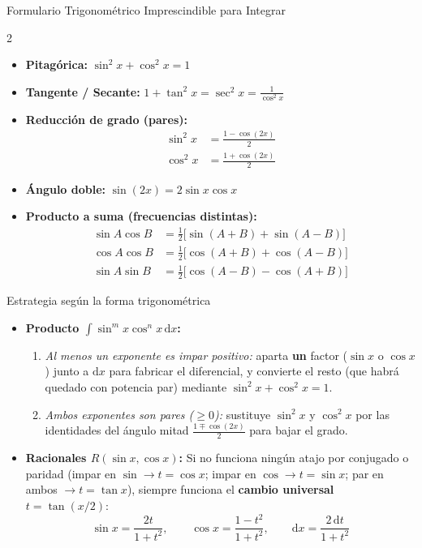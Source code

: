 \documentclass[10pt,a4paper]{article}
\begin{document}
\begin{formulabox}{Formulario Trigonométrico Imprescindible para Integrar}
\begin{multicols}{2}
\begin{itemize}\itemsep 2pt
  \item \textbf{Pitagórica:} $\sin^2 x + \cos^2 x = 1$
  \item \textbf{Tangente / Secante:} $1 + \tan^2 x = \sec^2 x = \frac{1}{\cos^2 x}$
  \item \textbf{Reducción de grado (pares):}
  \begin{align*}
    \sin^2 x &= \frac{1 - \cos(2x)}{2} \\
    \cos^2 x &= \frac{1 + \cos(2x)}{2}
  \end{align*}
  \item \textbf{Ángulo doble:} $\sin(2x) = 2\sin x\cos x$
  \item \textbf{Producto a suma (frecuencias distintas):}
  \begin{align*}
    \sin A\cos B &= \tfrac{1}{2}\big[\sin(A+B) + \sin(A-B)\big] \\
    \cos A\cos B &= \tfrac{1}{2}\big[\cos(A+B) + \cos(A-B)\big] \\
    \sin A\sin B &= \tfrac{1}{2}\big[\cos(A-B) - \cos(A+B)\big]
  \end{align*}
\end{itemize}
\end{multicols}
\end{formulabox}

\begin{trucobox}{Estrategia según la forma trigonométrica}
\begin{itemize}\itemsep 1.5pt
  \item \textbf{Producto $\displaystyle \int \sin^m x \cos^n x\,\mathrm{d}x$:}
  \begin{enumerate}\itemsep 1pt
    \item \textit{Al menos un exponente es impar positivo:} aparta \textbf{un} factor ($\sin x$ o $\cos x$) junto a $\mathrm{d}x$ para fabricar el diferencial, y convierte el resto (que habrá quedado con potencia par) mediante $\sin^2 x + \cos^2 x = 1$.
    \item \textit{Ambos exponentes son pares ($\ge 0$):} sustituye $\sin^2 x$ y $\cos^2 x$ por las identidades del ángulo mitad $\frac{1 \mp \cos(2x)}{2}$ para bajar el grado.
  \end{enumerate}
  \item \textbf{Racionales $R(\sin x, \cos x)$:} Si no funciona ningún atajo por conjugado o paridad (impar en $\sin \to t=\cos x$; impar en $\cos \to t=\sin x$; par en ambos $\to t=\tan x$), siempre funciona el \textbf{cambio universal} $t = \tan(x/2)$:
  $$\sin x = \frac{2t}{1 + t^2}, \qquad \cos x = \frac{1 - t^2}{1 + t^2}, \qquad \mathrm{d}x = \frac{2\,\mathrm{d}t}{1 + t^2}$$
\end{itemize}
\end{trucobox}
\end{document}
